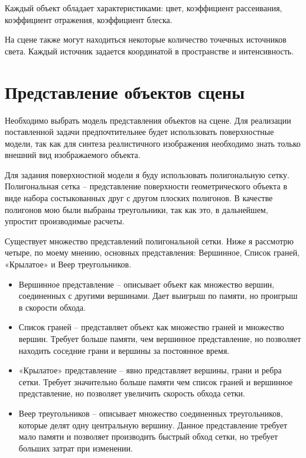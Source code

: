 \documentclass[12pt]{report}
\begin{document}
		Каждый объект обладает характеристиками: цвет, коэффициент рассеивания, коэффициент отражения, коэффициент блеска.
		
		На сцене также могут находиться некоторые количество точечных источников света. Каждый источник задается координатой в пространстве и интенсивность.
		
	\section{Представление объектов сцены}
	
	Необходимо выбрать модель представления объектов на сцене. Для реализации поставленной задачи предпочтительнее будет использовать поверхностные модели, так как для синтеза реалистичного изображения необходимо знать только внешний вид изображаемого объекта.
	
	Для задания поверхностной модели я буду использовать полигональную сетку. Полигональная сетка – представление поверхности геометрического объекта в виде набора состыкованных друг с другом плоских полигонов. В качестве полигонов мою были выбраны треугольники, так как это, в дальнейшем, упростит производимые расчеты.
	
	Существует множество представлений полигональной сетки. Ниже я рассмотрю четыре, по моему мнению, основных представления: Вершинное, Список граней, «Крылатое» и Веер треугольников.
	
	\begin{itemize}
		\item Вершинное представление – описывает объект как множество вершин, соединенных с другими вершинами. Дает выигрыш по памяти, но проигрыш в скорости обхода.
		\item Список граней – представляет объект как множество граней и множество вершин. Требует больше памяти, чем вершинное представление, но позволяет находить соседние грани и вершины за постоянное время.
		\item «Крылатое» представление – явно представляет вершины, грани и ребра сетки. Требует значительно больше памяти чем список граней и вершинное представление, но позволяет увеличить скорость обхода сетки.
		\item Веер треугольников – описывает множество соединенных треугольников, которые делят одну центральную вершину. Данное представление требует мало памяти и позволяет производить быстрый обход сетки, но требует больших затрат при изменении.
	\end{itemize}
\end{document}

